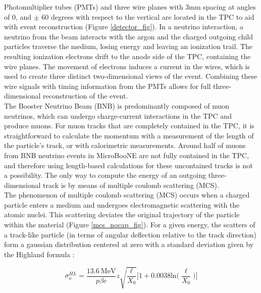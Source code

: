 \documentclass[a4paper,11pt]{article}
\begin{document}
Photomultiplier tubes (PMTs) and three wire planes with 3mm spacing at angles of 0, and $\pm$ 60 degrees with respect to the vertical are located in the TPC to aid with event reconstruction (Figure \ref{detector_fig}). In a neutrino interaction, a neutrino from the beam interacts with the argon and the charged outgoing child particles traverse the medium, losing energy and leaving an ionization trail. The resulting ionization electrons drift to the anode side of the TPC, containing the wire planes. The movement of electrons induces a current in the wires, which is used to create three distinct two-dimensional views of the event. Combining these wire signals with timing information from the PMTs allows for full three-dimensional reconstruction of the event.\\

The Booster Neutrino Beam (BNB) is predominantly composed of muon neutrinos, which can undergo charge-current interactions in the TPC and produce muons. For muon tracks that are completely contained in the TPC, it is straightforward to calculate the momentum with a measurement of the length of the particle's track, or with calorimetric measurements. Around half of muons from BNB neutrino events in MicroBooNE are not fully contained in the TPC, and therefore using length-based calculations for these uncontained tracks is not a possibility. The only way to compute the energy of an outgoing three-dimensional track is by means of multiple coulomb scattering (MCS). \\

The phenomenon of multiple coulomb scattering (MCS) occurs when a charged particle enters a medium and undergoes electromagnetic scattering with the atomic nuclei. This scattering deviates the original trajectory of the particle within the material (Figure \ref{mcs_nocap_fig}). For a given energy, the scatters of a track-like particle (in terms of angular deflection relative to the track direction) form a gaussian distribution centered at zero with a standard deviation given by the Highland formula \cite{highland}: 

\begin{equation}
	\sigma_o^{HL}=\frac{13.6\  \text{MeV}}{p\beta c}z\sqrt{\frac{\ell}{X_0}}\Big[1+0.0038\text{ln}\Big(\frac{\ell}{X_0}\Big)\Big]
\end{equation}\label{highland_eqtn}
\end{document}
